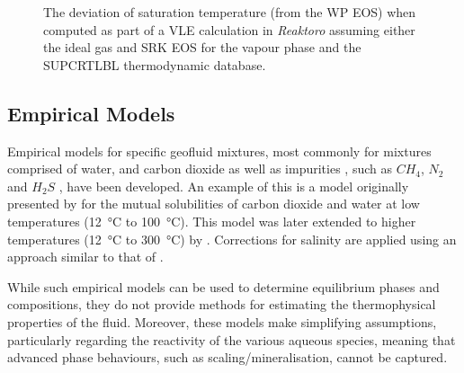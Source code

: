     \begin{figure}[H]
        \centering
        
        \caption[The deviation of saturation temperature from the \ac{WP} \ac{EOS}]{The deviation of saturation temperature (from the \ac{WP} \ac{EOS}) when computed as part of a \ac{VLE} calculation in \emph{Reaktoro} assuming either the ideal gas and \ac{SRK} \ac{EOS} for the vapour phase and the SUPCRTLBL thermodynamic database.}
        \label{fig:Tsat_vs_P}
    \end{figure}   
    
\subsection{Empirical Models}
\label{sec:partitioning_models}

    Empirical models for specific geofluid mixtures, most commonly for mixtures comprised of water, and carbon dioxide as well as impurities , such as \(CH_4\), \(N_2\) and \(H_2S\) , have been developed. An example of this is a model originally presented by \citeauthor{Spycher2003} \cite{Spycher2003} for the mutual solubilities of carbon dioxide and water at low temperatures (\qty{12}{\degreeCelsius} to \qty{100}{\degreeCelsius}). This model was later extended to higher temperatures (\qty{12}{\degreeCelsius} to \qty{300}{\degreeCelsius}) by \citeauthor{Spycher2009} \cite{Spycher2009}. Corrections for salinity are applied using an approach similar to that of \citeauthor{Duan2003} \cite{Duan2003}.

    While such empirical models can be used to determine equilibrium phases and compositions, they do not provide methods for estimating the thermophysical properties of the fluid. Moreover, these models make simplifying assumptions, particularly regarding the reactivity of the various aqueous species, meaning that advanced phase behaviours, such as scaling/mineralisation, cannot be captured.


